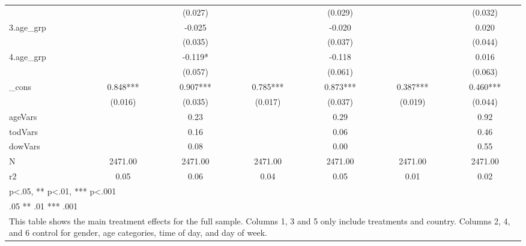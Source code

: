 {\begin{tabular}{l*{6}{c}}
            &               &     (0.027)   &               &     (0.029)   &               &     (0.032)   \\
[1em]
3.age\_grp   &               &      -0.025   &               &      -0.020   &               &       0.020   \\
            &               &     (0.035)   &               &     (0.037)   &               &     (0.044)   \\
[1em]
4.age\_grp   &               &      -0.119*  &               &      -0.118   &               &       0.016   \\
            &               &     (0.057)   &               &     (0.061)   &               &     (0.063)   \\
[1em]
\_cons      &       0.848***&       0.907***&       0.785***&       0.873***&       0.387***&       0.460***\\
            &     (0.016)   &     (0.035)   &     (0.017)   &     (0.037)   &     (0.019)   &     (0.044)   \\
\hline
ageVars     &               &        0.23   &               &        0.29   &               &        0.92   \\
todVars     &               &        0.16   &               &        0.06   &               &        0.46   \\
dowVars     &               &        0.08   &               &        0.00   &               &        0.55   \\
N           &     2471.00   &     2471.00   &     2471.00   &     2471.00   &     2471.00   &     2471.00   \\
r2          &        0.05   &        0.06   &        0.04   &        0.05   &        0.01   &        0.02   \\
\hline\hline
\multicolumn{7}{l}{\footnotesize * p<.05, ** p<.01, *** p<.001}\\
\multicolumn{7}{l}{\footnotesize * .05 ** .01 *** .001}\\
\multicolumn{7}{l}{\footnotesize This table shows the main treatment effects for the full sample. Columns 1, 3 and 5 only include treatments and country. Columns 2, 4, and 6 control for gender, age categories, time of day, and day of week.}\\
\end{tabular}
}
